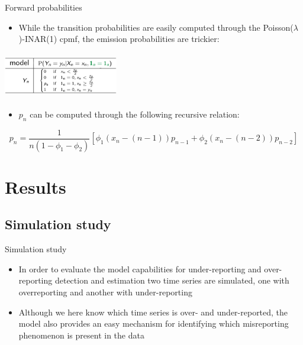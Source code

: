 \documentclass[aspectratio=169,usepdftitle=true]{beamer}
\begin{document}
\begin{frame}{Forward probabilities}
\begin{itemize}
 \item While the transition probabilities are easily computed through
the Poisson($\lambda$)-INAR(1) cpmf, the emission probabilities are
trickier:
\end{itemize}
\begin{center}
\includegraphics[height=2cm,width=5cm]{emission.png}
\end{center}
\begin{itemize}
 \item $p_n$ can be computed through the following recursive relation:
\end{itemize}
\begin{equation}
p_n = \frac{1}{n(1-\phi_1 - \phi_2)} [\phi_1 (x_n - (n-1))p_{n-1} + \phi_2 (x_n - (n-2))p_{n-2}]
\end{equation}
\end{frame}

\section{Results}
\subsection{Simulation study}
\begin{frame}{Simulation study}
\begin{itemize}
 \item In order to evaluate the model capabilities for under-reporting and over-reporting
detection and estimation two time series are simulated, one with overreporting
and another with under-reporting
 \item Although we here know which time series is over- and under-reported, the model also provides an
easy mechanism for identifying which misreporting phenomenon is present in the
data
\end{itemize}
\end{frame}
\end{document}
